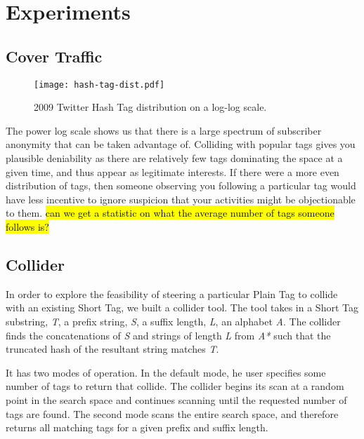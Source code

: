 \section{Experiments}

\subsection{Cover Traffic}

\begin{figure}
\begin{center}
\texttt{[image: hash-tag-dist.pdf]}
\caption{2009 Twitter Hash Tag distribution on a log-log scale.
\label{fig:hash-dist}
}
\end{center}
\end{figure}

The power log scale shows us that there is a large spectrum of subscriber anonymity that can be taken advantage of. Colliding with popular tags gives you plausible deniability as there are relatively few tags dominating the space at a given time, and thus appear as legitimate interests. If there were a more even distribution of tags, then someone observing you following a particular tag would have less incentive to ignore suspicion that your activities might be objectionable to them. \hl{can we get a statistic on what the average number of tags someone follows is?}

\subsection{Collider}

In order to explore the feasibility of steering a particular Plain Tag to collide with an existing Short Tag, we built a collider tool. The tool takes in a Short Tag substring, \textit{T}, a prefix string, \textit{S}, a suffix length, \textit{L}, an alphabet 
\textit{A}. The collider finds the concatenations of \textit{S} and strings of length \textit{L} from \textit{A*} such that the truncated hash of the resultant string matches \textit{T}.

It has two modes of operation. In the default mode, he user specifies some number of tags to return that collide. The collider begins its scan at a random point in the search space and continues scanning until the requested number of tags are found. The second mode scans the entire search space, and therefore returns all matching tags for a given prefix and suffix length.

